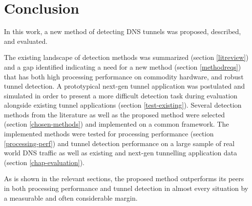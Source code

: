 \documentclass{llncs}
\begin{document}
\section{Conclusion}
\label{conclusion}

In this work, a new method of detecting DNS tunnels was proposed, described, and
evaluated.

The existing landscape of detection methods was summarized (section
\ref{litreview}) and a gap identified indicating a need for a new method
(section \ref{methodreqs}) that has both high processing performance on
commodity hardware, and robust tunnel detection. A prototypical next-gen tunnel
application was postulated and simulated in order to present a more difficult detection
task during evaluation alongside existing tunnel applications (section
\ref{test-existing}). Several detection methods from the literature as well as
the proposed method were selected (section \ref{chosen-methods}) and implemented
on a common framework. The implemented methods
were tested for processing performance (section \ref{processing-perf}) and
tunnel detection performance on a large sample of real world DNS traffic as well
as existing and next-gen tunnelling application data (section
\ref{chap-evaluation}).

As is shown in the relevant sections, the proposed method outperforms its peers
in both processing performance and tunnel detection in almost every situation by
a measurable and often considerable margin.
\end{document}
